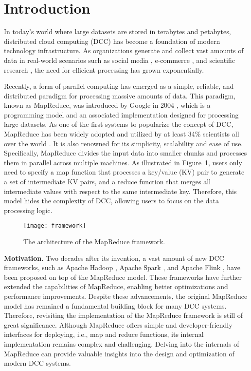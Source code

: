 \section{Introduction}
\label{sec:introduction}

In today's world where large datasets are stored in
terabytes and petabytes, distributed cloud computing (DCC) has become a foundation of modern technology infrastructure. As organizations generate and collect vast amounts of data in real-world scenarios such as social media \cite{ali2013cloud}, e-commerce \cite{wang2013influences}, and scientific research \cite{gunarathne2010mapreduce}, the need for efficient processing has grown exponentially. 

Recently, a form of parallel computing has emerged as a simple, reliable, and distributed paradigm for processing massive amounts of data. This paradigm, known as MapReduce, was introduced by Google in 2004 \cite{dean2008mapreduce}, which is a programming model and an associated implementation designed for processing large datasets. As one of the first systems to popularize the concept of DCC, MapReduce has been widely adopted and utilized by at least 34\% scientists all over the world \cite{kim2017data}. It is also renowned for its simplicity, scalability and ease of use. Specifically, MapReduce divides the input data into smaller chunks and processes them in parallel across multiple machines. As illustrated in Figure~\ref{fig:mapreduce-framework}, users only need to specify a map function that processes a key/value (KV) pair to generate a set of intermediate KV pairs, and a reduce function that merges all intermediate values with respect to the same intermediate key. Therefore, this model hides the complexity of DCC, allowing users to focus on the data processing logic.

\begin{figure}
    \centering
    \texttt{[image: framework]}
    \caption{The architecture of the MapReduce framework.}
    \label{fig:mapreduce-framework}
\end{figure}

\noindent\textbf{Motivation.} Two decades after its invention, a vast amount of new DCC frameworks, such as Apache Hadoop \cite{white2012hadoop}, Apache Spark \cite{zaharia2016apache}, and Apache Flink \cite{katsifodimos2016apache}, have been proposed on top of the MapReduce model. These frameworks have further extended the capabilities of MapReduce, enabling better optimizations and performance improvements. Despite these advancements, the original MapReduce model has remained a fundamental building block for many DCC systems. Therefore, revisiting the implementation of the MapReduce framework is still of great significance. Although MapReduce offers simple and developer-friendly interfaces for deploying, i.e., map and reduce functions, its internal implementation remains complex and challenging. Delving into the internals of MapReduce can provide valuable insights into the design and optimization of modern DCC systems.

